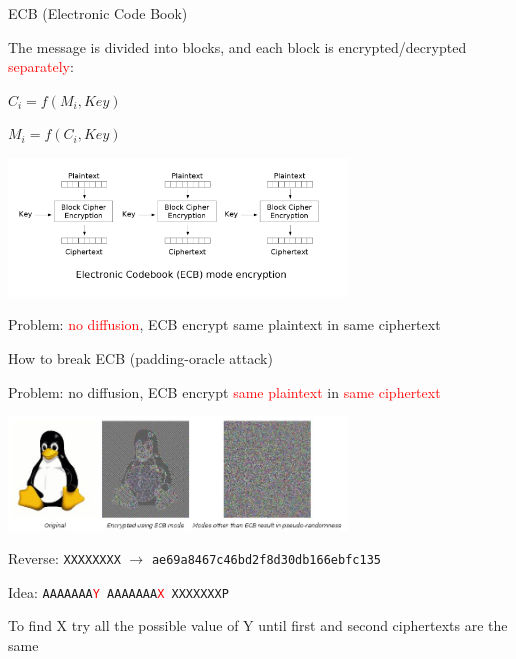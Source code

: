 \begin{frame}{ECB (Electronic Code Book)}

The message is divided into blocks, and each block is encrypted/decrypted \textcolor{red}{separately}:

\medskip

\centerline{$C_i = f(M_i, Key)$}

\centerline{$M_i = f(C_i, Key)$}

\medskip

\centerline{\includegraphics[width=9cm]{img/ECB.png}}

\medskip

Problem: \textcolor{red}{no diffusion}, ECB encrypt same plaintext in same ciphertext

\end{frame}

\begin{frame}{How to break ECB (padding-oracle attack)}

  Problem: no diffusion, ECB encrypt \textcolor{red}{same plaintext} in \textcolor{red}{same ciphertext}
  
  \medskip
  
  \centerline{\includegraphics[width=9cm]{img/tux.jpg}}

  \medskip
  
  Reverse: \texttt{XXXXXXXX} $\rightarrow$ \texttt{ae69a8467c46bd2f8d30db166ebfc135}

  Idea: \texttt{AAAAAAA\textcolor{red}{Y} AAAAAAA\textcolor{red}{X} XXXXXXXP}
  
  \medskip
  
  To find X try all the possible value of Y until first and second ciphertexts are the same
  
\end{frame}

